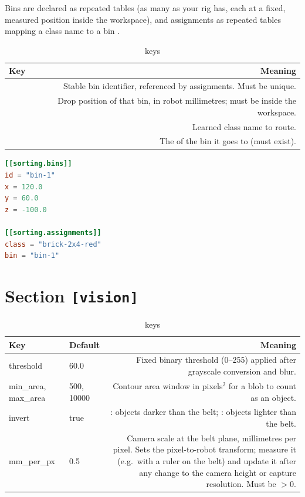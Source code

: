 Bins are declared as repeated  tables (as many as your
rig has, each at a fixed, measured position inside the workspace), and
assignments as repeated  tables mapping a class
name to a bin .
\begin{table}[h]
  \centering
  \begin{tabularx}{\textwidth}{KD}
    \toprule
    \textbf{Key} & \textbf{Meaning} \\
    \midrule
      & Stable bin identifier, referenced by
      assignments. Must be unique. \\
      & Drop position of that bin, in robot
      millimetres; must be inside the workspace. \\
      & Learned class name to route. \\
      & The  of the bin it goes
      to (must exist). \\
    \bottomrule
  \end{tabularx}
  \caption{\cfg{[sorting]} keys}
\end{table}

\begin{lstlisting}[language=TOML]
[[sorting.bins]]
id = "bin-1"
x = 120.0
y = 60.0
z = -100.0

[[sorting.assignments]]
class = "brick-2x4-red"
bin = "bin-1"
\end{lstlisting}

\section{Section \texttt{[vision]}}
%
\begin{table}[h]
  \centering
  \begin{tabularx}{\textwidth}{KTD}
    \toprule
    \textbf{Key} & \textbf{Default} & \textbf{Meaning} \\
    \midrule
    threshold & 60.0 & Fixed binary threshold (0--255) applied after
      grayscale conversion and blur. \\
    min\_area, max\_area & 500, 10000 & Contour area window in pixels$^2$
      for a blob to count as an object. \\
    invert & true & : objects darker than the belt;
      : objects lighter than the belt. \\
    mm\_per\_px & 0.5 & Camera scale at the belt plane, millimetres per
      pixel. Sets the pixel-to-robot transform; measure it (e.g.\ with a
      ruler on the belt) and update it after any change to the camera
      height or capture resolution. Must be $> 0$. \\
    \bottomrule
  \end{tabularx}
  \caption{\cfg{[vision]} keys}
\end{table}

